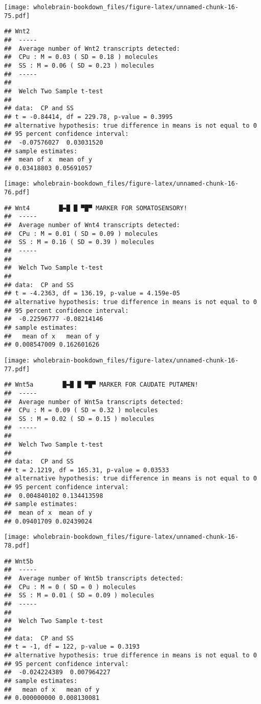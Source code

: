 \documentclass[]{book}
\theoremstyle{definition}
\theoremstyle{definition}
\theoremstyle{remark}
\begin{document}
\texttt{[image: wholebrain-bookdown\_files/figure-latex/unnamed-chunk-16-75.pdf]}

\begin{verbatim}
## Wnt2
##  -----
##  Average number of Wnt2 transcripts detected:
##  CPu : M = 0.03 ( SD = 0.18 ) molecules 
##  SS : M = 0.06 ( SD = 0.23 ) molecules
##  -----
## 
##  Welch Two Sample t-test
## 
## data:  CP and SS
## t = -0.84414, df = 229.78, p-value = 0.3995
## alternative hypothesis: true difference in means is not equal to 0
## 95 percent confidence interval:
##  -0.07576027  0.03031520
## sample estimates:
##  mean of x  mean of y 
## 0.03418803 0.05691057
\end{verbatim}

\texttt{[image: wholebrain-bookdown\_files/figure-latex/unnamed-chunk-16-76.pdf]}

\begin{verbatim}
## Wnt4        █▬█ █ ▀█▀ MARKER FOR SOMATOSENSORY!
##  -----
##  Average number of Wnt4 transcripts detected:
##  CPu : M = 0.01 ( SD = 0.09 ) molecules 
##  SS : M = 0.16 ( SD = 0.39 ) molecules
##  -----
## 
##  Welch Two Sample t-test
## 
## data:  CP and SS
## t = -4.2363, df = 136.19, p-value = 4.159e-05
## alternative hypothesis: true difference in means is not equal to 0
## 95 percent confidence interval:
##  -0.22596777 -0.08214146
## sample estimates:
##   mean of x   mean of y 
## 0.008547009 0.162601626
\end{verbatim}

\texttt{[image: wholebrain-bookdown\_files/figure-latex/unnamed-chunk-16-77.pdf]}

\begin{verbatim}
## Wnt5a        █▬█ █ ▀█▀ MARKER FOR CAUDATE PUTAMEN!
##  -----
##  Average number of Wnt5a transcripts detected:
##  CPu : M = 0.09 ( SD = 0.32 ) molecules 
##  SS : M = 0.02 ( SD = 0.15 ) molecules
##  -----
## 
##  Welch Two Sample t-test
## 
## data:  CP and SS
## t = 2.1219, df = 165.31, p-value = 0.03533
## alternative hypothesis: true difference in means is not equal to 0
## 95 percent confidence interval:
##  0.004840102 0.134413598
## sample estimates:
##  mean of x  mean of y 
## 0.09401709 0.02439024
\end{verbatim}

\texttt{[image: wholebrain-bookdown\_files/figure-latex/unnamed-chunk-16-78.pdf]}

\begin{verbatim}
## Wnt5b
##  -----
##  Average number of Wnt5b transcripts detected:
##  CPu : M = 0 ( SD = 0 ) molecules 
##  SS : M = 0.01 ( SD = 0.09 ) molecules
##  -----
## 
##  Welch Two Sample t-test
## 
## data:  CP and SS
## t = -1, df = 122, p-value = 0.3193
## alternative hypothesis: true difference in means is not equal to 0
## 95 percent confidence interval:
##  -0.024224389  0.007964227
## sample estimates:
##   mean of x   mean of y 
## 0.000000000 0.008130081
\end{verbatim}
\end{document}
